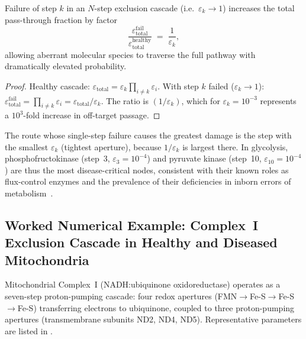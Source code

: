 \begin{theorem}
\label{thm:ch03-cascade-failure}
Failure of step $k$ in an $N$-step exclusion cascade (i.e.\ $\varepsilon_k\to 1$)
increases the total pass-through fraction by factor
\begin{equation}
    \frac{\varepsilon_{\mathrm{total}}^{\mathrm{fail}}}
         {\varepsilon_{\mathrm{total}}^{\mathrm{healthy}}}
    \;=\;
    \frac{1}{\varepsilon_k},
    \label{eq:ch03-cascade-fail}
\end{equation}
allowing aberrant molecular species to traverse the full pathway with
dramatically elevated probability.
\end{theorem}

\begin{proof}
Healthy cascade: $\varepsilon_{\mathrm{total}}=\varepsilon_k\prod_{i\neq k}\varepsilon_i$.
With step $k$ failed ($\varepsilon_k\to 1$):
$\varepsilon_{\mathrm{total}}^{\mathrm{fail}}=\prod_{i\neq k}\varepsilon_i=
\varepsilon_{\mathrm{total}}/\varepsilon_k$.
The ratio is $(1/\varepsilon_k)$, which for $\varepsilon_k=10^{-3}$
represents a $10^3$-fold increase in off-target passage.
\end{proof}

\begin{corollary}
The route whose single-step failure causes the greatest damage is the
step with the smallest $\varepsilon_k$ (tightest aperture), because
$1/\varepsilon_k$ is largest there.  In glycolysis, phosphofructokinase
(step~3, $\varepsilon_3=10^{-4}$) and pyruvate kinase (step~10,
$\varepsilon_{10}=10^{-4}$) are thus the most disease-critical nodes,
consistent with their known roles as flux-control enzymes and the
prevalence of their deficiencies in inborn errors of
metabolism~\citep{nelson2008lehninger}.
\end{corollary}

\subsection{Worked Numerical Example: Complex~I Exclusion Cascade in
             Healthy and Diseased Mitochondria}

Mitochondrial Complex~I (NADH:ubiquinone oxidoreductase) operates as a
seven-step proton-pumping cascade: four redox apertures
(FMN$\to$Fe-S$\to$Fe-S$\to$Fe-S) transferring electrons to ubiquinone,
coupled to three proton-pumping apertures (transmembrane subunits ND2,
ND4, ND5).  Representative parameters are listed in
.

